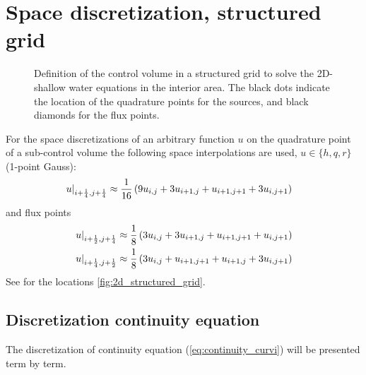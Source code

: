 \section{Space discretization, structured grid}
\begin{figure}[H]
    \begin{center}
        \def\svgwidth{0.80\textwidth} %
    \end{center}
    \caption[Definition of the grid to solve the 2D-shallow water equations in the interior area]
{Definition of the control volume in a structured grid to solve the 2D-shallow water equations in the interior area. The black dots indicate the location of the quadrature points for the sources, and black diamonds for the flux points.}
    \label{fig:2d_structured_grid}
\end{figure}
For the space discretizations of an arbitrary function $u$ on the quadrature point of a sub-control volume the following space interpolations are used, $u \in \{h,q,r\}$ (1-point Gauss):
\begin{align}
    \left. u\right|_{i+\frac{1}{4}, j+\frac{1}{4}} & \approx \frac{1}{16}\left( 9u_{i, j} + 3 u_{i+1,j} + u_{i+1, j+1} + 3  u_{i, j+1}\right)
\end{align}
and flux points
\begin{align}
    \left.u\right|_{i+\frac{1}{2}, j+\frac{1}{4}} & \approx \frac{1}{8} \left( 3 u_{i,j} + 3 u_{i+1,j} + u_{i+1, j+1} + u_{i, j+1} \right)
    \\
    \left. u \right|_{i+\frac{1}{4}, j+\frac{1}{2}} & \approx \frac{1}{8} \left( 3 u_{i, j} + u_{i+1, j+1} + u_{i+1, j}  + 3 u_{i, j+1} \right)
\end{align}
See for the locations \autoref{fig:2d_structured_grid}.
\subsection{Discretization continuity equation}
The discretization of continuity equation (\autoref{eq:continuity_curvi}) will be presented term by term.

